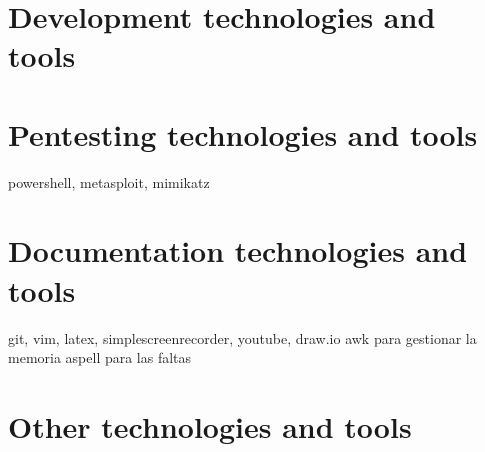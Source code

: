 \section{Development technologies and tools}
\section{Pentesting technologies and tools}
powershell, metasploit, mimikatz
\section{Documentation technologies and tools}
git, vim, latex, simplescreenrecorder, youtube, draw.io
awk para gestionar la memoria
aspell para las faltas
\section{Other technologies and tools}

